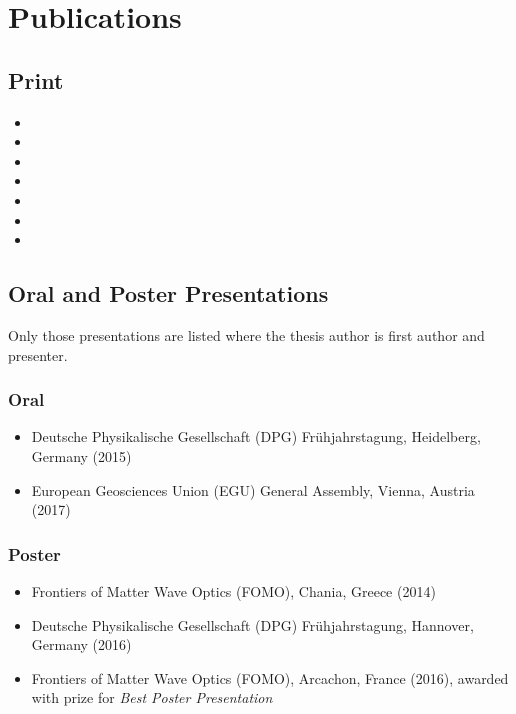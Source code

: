 \chapter*{Publications}\label{app:publications}

\begin{refsection}

	\section*{Print}
	\begin{itemize}
		\item {}
		\item {}
		\item {}
		\item {}
		\item {}
		\item {}
		\item {}
	\end{itemize}

	\section*{Oral and Poster Presentations}
	Only those presentations are listed where the thesis author is first  author and presenter.
	\subsection*{Oral}
	\begin{itemize}
		\item Deutsche Physikalische Gesellschaft (DPG) Frühjahrstagung, Heidelberg, Germany (2015)
		\item European Geosciences Union (EGU) General Assembly, Vienna, Austria (2017)
	\end{itemize}
	\subsection*{Poster}
	\begin{itemize}
		\item Frontiers of Matter Wave Optics (FOMO), Chania, Greece (2014)
		\item Deutsche Physikalische Gesellschaft (DPG) Frühjahrstagung, Hannover, Germany (2016)
		\item Frontiers of Matter Wave Optics (FOMO), Arcachon, France (2016), awarded with prize for \emph{Best Poster Presentation}
	\end{itemize}

\end{refsection}